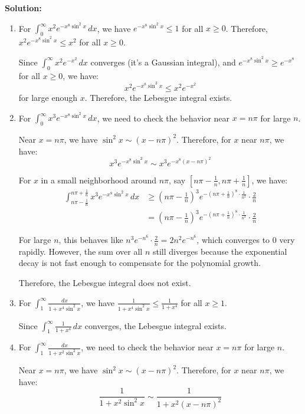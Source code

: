 \bigskip\noindent\textbf{Solution:}
\begin{enumerate}[label=(\alph*)]
\item For $\int_{0}^{\infty} x^2 e^{-x^8 \sin^2 x} \, dx$, we have $e^{-x^8 \sin^2 x} \leq 1$ for all $x \geq 0$. Therefore, $x^2 e^{-x^8 \sin^2 x} \leq x^2$ for all $x \geq 0$.

Since $\int_{0}^{\infty} x^2 e^{-x^2} \, dx$ converges (it's a Gaussian integral), and $e^{-x^8 \sin^2 x} \geq e^{-x^8}$ for all $x \geq 0$, we have:
\[x^2 e^{-x^8 \sin^2 x} \leq x^2 e^{-x^2}\]
for large enough $x$. Therefore, the Lebesgue integral exists.

\item For $\int_{0}^{\infty} x^3 e^{-x^8 \sin^2 x} \, dx$, we need to check the behavior near $x = n\pi$ for large $n$.

Near $x = n\pi$, we have $\sin^2 x \sim (x - n\pi)^2$. Therefore, for $x$ near $n\pi$, we have:
\[x^3 e^{-x^8 \sin^2 x} \sim x^3 e^{-x^8 (x - n\pi)^2}\]

For $x$ in a small neighborhood around $n\pi$, say $[n\pi - \frac{1}{n}, n\pi + \frac{1}{n}]$, we have:
\begin{align*}
\int_{n\pi - \frac{1}{n}}^{n\pi + \frac{1}{n}} x^3 e^{-x^8 \sin^2 x} \, dx &\geq (n\pi - \frac{1}{n})^3 e^{-(n\pi + \frac{1}{n})^8 \cdot \frac{1}{n^2}} \cdot \frac{2}{n} \\
&= (n\pi - \frac{1}{n})^3 e^{-(n\pi + \frac{1}{n})^8 \cdot \frac{1}{n^2}} \cdot \frac{2}{n}
\end{align*}

For large $n$, this behaves like $n^3 e^{-n^6} \cdot \frac{2}{n} = 2n^2 e^{-n^6}$, which converges to 0 very rapidly. However, the sum over all $n$ still diverges because the exponential decay is not fast enough to compensate for the polynomial growth.

Therefore, the Lebesgue integral does not exist.

\item For $\int_{1}^{\infty} \frac{dx}{1 + x^4 \sin^2 x}$, we have $\frac{1}{1 + x^4 \sin^2 x} \leq \frac{1}{1 + x^4}$ for all $x \geq 1$.

Since $\int_{1}^{\infty} \frac{1}{1 + x^4} \, dx$ converges, the Lebesgue integral exists.

\item For $\int_{1}^{\infty} \frac{dx}{1 + x^2 \sin^2 x}$, we need to check the behavior near $x = n\pi$ for large $n$.

Near $x = n\pi$, we have $\sin^2 x \sim (x - n\pi)^2$. Therefore, for $x$ near $n\pi$, we have:
\[\frac{1}{1 + x^2 \sin^2 x} \sim \frac{1}{1 + x^2 (x - n\pi)^2}\]


\end{enumerate}
